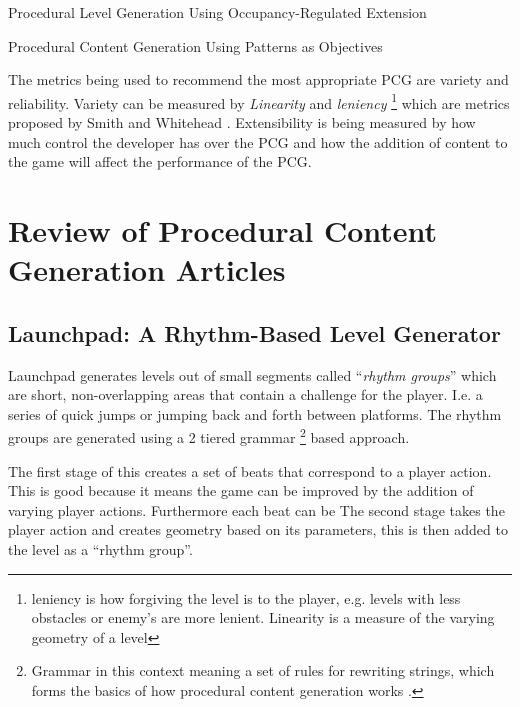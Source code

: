 \documentclass{scrartcl}
\begin{document}
Procedural Level Generation Using Occupancy-Regulated Extension \cite{mawhorter2010} \par

Procedural Content Generation Using Patterns as Objectives \cite{dahlskog2014} \par

The metrics being used to recommend the most appropriate PCG are variety and reliability. Variety can be measured by \textit{Linearity} and \textit{leniency} \footnote{leniency is how forgiving the level is to the player, e.g. levels with less obstacles or enemy's are more lenient. Linearity is a measure of the varying geometry of a level} which are metrics proposed by Smith and Whitehead \cite{smith2010}. Extensibility is being measured by how much control the developer has over the PCG and how the addition of content to the game will affect the performance of the PCG.


\section{Review of Procedural Content Generation Articles}

\subsection{Launchpad: A Rhythm-Based Level Generator}

Launchpad generates levels out of small segments called ``\textit{rhythm groups}''  which are short, non-overlapping areas that contain a challenge for the player. I.e. a series of quick jumps or jumping back and forth between platforms. The rhythm groups are generated using a 2 tiered grammar \footnote{Grammar in this context meaning a set of rules for rewriting strings, which forms the basics of how procedural content generation works \cite{shaker2015}.} based approach.

The first stage of this creates a set of beats that correspond to a player action. This is good because it means the game can be improved by the addition of varying player actions. Furthermore each beat can be
The second stage takes the player action and creates geometry based on its parameters, this is then added to the level as a ``rhythm group''. 
\end{document}
